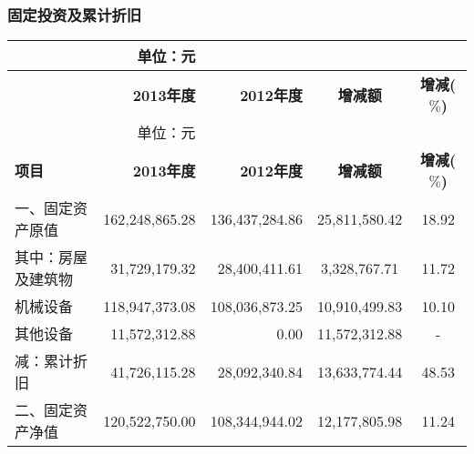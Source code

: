 \subsubsection{固定投资及累计折旧}
\renewcommand*{\arraystretch}{0.8}
\setlength{\tabcolsep}{6pt}
\begin{longtable}{>{\footnotesize}l>{\footnotesize}r>{\footnotesize}r>{\footnotesize}c>{\footnotesize}c}
 \multicolumn{4}{c}{\footnotesize \bfseries 固定投资及累计折旧} & {\scriptsize 单位：元}\\
\hline\hline
\rowcolor{mycyan} \hspace{4em}{\bfseries \footnotesize  项目} & {\bfseries \footnotesize  2013年度}\hspace{2ex} & {\bfseries \footnotesize   2012年度}\hspace{2ex} &  {\bfseries \footnotesize  增减额}\hspace{4ex}      & {\bfseries \footnotesize  增减($\%$)} \\  \endfirsthead          %
 \multicolumn{4}{c}{\footnotesize \bfseries 固定投资及累计折旧（续表）} & {\scriptsize 单位：元}\\                         %
\hline\hline
\rowcolor{mycyan} {\bfseries \footnotesize  项目} & {\bfseries \footnotesize  2013年度}\hspace{2ex} & {\bfseries \footnotesize   2012年度}\hspace{2ex} &  {\bfseries \footnotesize  增减额}      & {\bfseries \footnotesize  增减($\%$)}  \\  \endhead                %
\hline
\endfoot
\hline   %
一、固定资产原值 & 162,248,865.28 & 136,437,284.86 & 25,811,580.42 & 18.92\\
\hspace{2em}其中：房屋及建筑物 & 31,729,179.32 & 28,400,411.61 & 3,328,767.71 & 11.72\\
\hspace{3em}机械设备 & 118,947,373.08 & 108,036,873.25 & 10,910,499.83 & 10.10\\
\hspace{3em}其他设备 & 11,572,312.88 & 0.00 & 11,572,312.88	& -\\
\hspace{3em}减：累计折旧 & 41,726,115.28 & 28,092,340.84 & 13,633,774.44 & 48.53\\
二、固定资产净值 & 120,522,750.00 & 108,344,944.02 & 12,177,805.98 & 11.24\\
\bottomrule
\end{longtable}
						
